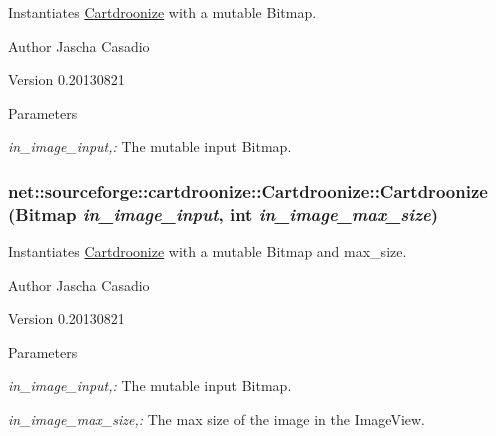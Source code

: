 Instantiates \hyperlink{classnet_1_1sourceforge_1_1cartdroonize_1_1Cartdroonize}{Cartdroonize} with a mutable Bitmap. \begin{DoxyAuthor}{Author}
Jascha Casadio 
\end{DoxyAuthor}
\begin{DoxyVersion}{Version}
0.20130821 
\end{DoxyVersion}

\begin{DoxyParams}{Parameters}
\item[{\em in\_\-image\_\-input,:}]The mutable input Bitmap.\end{DoxyParams}


\hypertarget{classnet_1_1sourceforge_1_1cartdroonize_1_1Cartdroonize_a1fd8ab3bf55781769784ad493c57a4c3}{
\subsubsection[{Cartdroonize}]{\setlength{\rightskip}{0pt plus 5cm}net::sourceforge::cartdroonize::Cartdroonize::Cartdroonize (Bitmap {\em in\_\-image\_\-input}, \/  int {\em in\_\-image\_\-max\_\-size})}}
\label{classnet_1_1sourceforge_1_1cartdroonize_1_1Cartdroonize_a1fd8ab3bf55781769784ad493c57a4c3}


Instantiates \hyperlink{classnet_1_1sourceforge_1_1cartdroonize_1_1Cartdroonize}{Cartdroonize} with a mutable Bitmap and max\_\-size. \begin{DoxyAuthor}{Author}
Jascha Casadio 
\end{DoxyAuthor}
\begin{DoxyVersion}{Version}
0.20130821 
\end{DoxyVersion}

\begin{DoxyParams}{Parameters}
\item[{\em in\_\-image\_\-input,:}]The mutable input Bitmap. \item[{\em in\_\-image\_\-max\_\-size,:}]The max size of the image in the ImageView.\end{DoxyParams}




